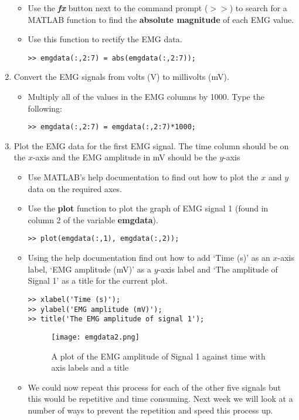 \documentclass[12pt,a4paper]{article}
\begin{document}
\begin{enumerate}
\begin{itemize}
		\item Use the \textit{\textbf{fx}} button next to the command prompt ($>>$) to search for a MATLAB function to find the \textbf{absolute magnitude} of each EMG value.
		\item Use this function to rectify the EMG data.		
		\begin{lstlisting}[style=Matlab-editor]
>> emgdata(:,2:7) = abs(emgdata(:,2:7));
		\end{lstlisting}
	\end{itemize}
	\item Convert the EMG signals from volts (V) to millivolts (mV).
	\begin{itemize}
		\item Multiply all of the values in the EMG columns by 1000. 
		Type the following:
		\begin{lstlisting}[style=Matlab-editor]
>> emgdata(:,2:7) = emgdata(:,2:7)*1000;
		\end{lstlisting}
	\end{itemize}
	\item Plot the EMG data for the first EMG signal.  The time column should be on the $x$-axis and the EMG amplitude in mV should be the $y$-axis
	\begin{itemize}
		\item Use MATLAB's help documentation to find out how to plot the $x$ and $y$ data on the required axes.
		\item Use the \textbf{plot} function to plot the graph of EMG signal 1 (found in column 2 of the variable \textbf{emgdata}).
		\begin{lstlisting}[style=Matlab-editor]
>> plot(emgdata(:,1), emgdata(:,2));
		\end{lstlisting}		
		\item Using the help documentation find out how to add `Time (s)' as an $x$-axis label, `EMG amplitude (mV)' as a $y$-axis label and `The amplitude of Signal 1' as a title for the current plot.
		\begin{lstlisting}[style=Matlab-editor]
>> xlabel('Time (s)');
>> ylabel('EMG amplitude (mV)');
>> title('The EMG amplitude of signal 1');
		\end{lstlisting}	
		\begin{figure}[H]
\begin{center}
\texttt{[image: emgdata2.png]}
\caption{A plot of the EMG amplitude of Signal 1 against time with axis labels and a title}
\label{fig:plot}
\end{center}
\end{figure}
		\item We could now repeat this process for each of the other five signals but this would be repetitive and time consuming.  
		Next week we will look at a number of ways to prevent the repetition and speed this process up.
	\end{itemize}
\end{enumerate}
\end{document}
